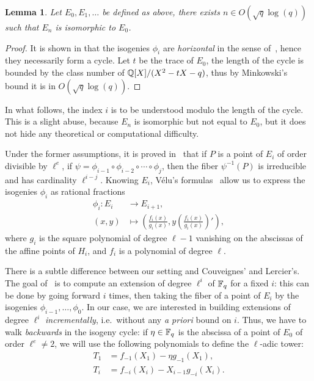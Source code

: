 \documentclass{sig-alternate}
\newtheorem{lemma}[definition]{Lemma}
\begin{document}
\begin{lemma}
  \label{th:class-number}
  Let $E_0,E_1,\dots$ be defined as above, there exists $n\in
  O(\sqrt{q}\log (q))$ such that $E_n$ is isomorphic to $E_0$.
\end{lemma}
\begin{proof}
  It is shown in \cite[Section~4]{couveignes+lercier11} that the
  isogenies $\phi_i$ are \emph{horizontal} in the sense
  of~\cite{kohel}, hence they necessarily form a cycle. Let $t$ be the
  trace of $E_0$, the length of the cycle is bounded by the class
  number of $\mathbb{Q}[X]/(X^2-tX-q)$, thus by Minkowski's bound it is in
  $O(\sqrt{q}\log (q))$.
\end{proof}

In what follows, the index $i$ is to be understood modulo the length of
the cycle. This is a slight abuse, because $E_n$ is isomorphic but not
equal to $E_0$, but it does not hide any theoretical or computational
difficulty.

Under the former assumptions, it is proved
in~\cite[Section~4]{couveignes+lercier11} that if $P$ is a point of
$E_i$ of order divisible by $\ell^e$, if
$\psi=\phi_{i-1}\circ\phi_{i-2}\circ\cdots\circ\phi_{j}$, then the
fiber $\psi^{-1}(P)$ is irreducible and has cardinality $\ell^{i-j}$.
Knowing $E_i$, Vélu's formulas~\cite{velu71} allow us to express the
isogenies $\phi_i$ as rational fractions
\begin{equation}
  \begin{aligned}
    \phi_i: E_i &\to E_{i+1},\\
    (x,y) &\mapsto \left(\frac{f_i(x)}{g_i(x)}, y\left(\frac{f_i(x)}{g_i(x)}\right)'\right),
  \end{aligned}
\end{equation}
where $g_i$ is the square polynomial of degree $\ell-1$ vanishing on
the abscissas of the affine points of $H_i$, and $f_i$ is a polynomial
of degree $\ell$. 

There is a subtle difference between our setting and Couveignes' and
Lercier's. The goal of~\cite{couveignes+lercier11} is to compute an
extension of degree $\ell^i$ of $\mathbb{F}_q$ for a fixed $i$: this can be
done by going forward $i$ times, then taking the fiber of a point of $E_i$ by
the isogenies $\phi_{i-1}, \ldots, \phi_0$. In our case, we are
interested in building extensions of degree $\ell^i$
\emph{incrementally}, i.e.\ without any \emph{a priori} bound on
$i$. Thus, we have to walk \emph{backwards} in the isogeny cycle: if
$\eta\in\mathbb{F}_q$ is the abscissa of a point of $E_0$ of order $\ell^e\ne
2$, we will use the following polynomials to define the $\ell$-adic
tower:
\begin{align*}
  T_1 &= f_{-1}(X_1) - \eta g_{-1}(X_1),\\ 
  T_i &= f_{-i}(X_i) - X_{i-1} g_{-i}(X_i).
\end{align*}
\end{document}
